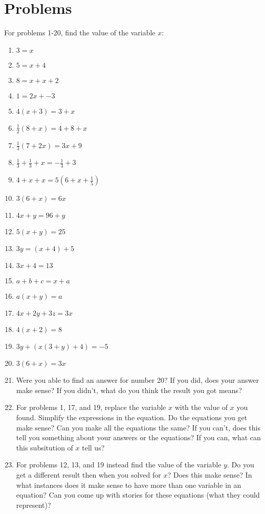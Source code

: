 \documentclass{article}
\begin{document}
\section*{Problems}
\begin{multicols*}{2}
    For problems 1-20, find the value of the variable $x$: 
    \begin{enumerate}
        \item $3 = x$ 
        \item $5 = x + 4 $
        \item $8 = x + x + 2$
        \item $1 = 2x + -3$
        \item $4(x + 3) = 3 + x$
        \item $\frac{1}{2} (8 + x) = 4 + 8 + x$ 
        \item $\frac{1}{3} ( 7 + 2x) = 3x + 9$
        \item $ \frac{1}{3} + \frac{1}{3} + x = -\frac{1}{3} + 3$
        \item $ 4 + x + x = 5(6 + x + \frac{1}{5}) $
        \item $ 3(6 + x) = 6x  $
        \item $ 4x + y = 96 + y $
        \item $ 5(x + y) = 25 $
        \item $ 3y = (x + 4) + 5$
        \item $ 3x + 4 = 13 $
        \item $ a + b + c = x + a$
        \item $ a(x + y) = a $
        \item $ 4x + 2y + 3z = 3x $
        \item $ 4(x + 2) = 8 $
        \item $ 3y + (x(3 + y) + 4) = -5 $
        \item $ 3(6 + x) = 3x $
        \item Were you able to find an answer for number 20? If you did, does your answer make sense? If you didn't, what do you think the result you got means? 
        \item For problems 1, 17, and 19, replace the variable $x$ with the value of $x$ you found. Simplify the expressions in the equation. Do the equations you get make sense? Can you make all the equations the same? If you can't, does this tell you something about your answers or the equations? If you can, what can this subsitution of $x$ tell us? 
        \item For problems 12, 13, and 19 instead find the value of the variable $y$. Do you get a different result then when you solved for $x$? Does this make sense? In what instances does it make sense to have more than one variable in an equation? Can you come up with stories for these equations (what they could represent)?

\end{enumerate}
\end{multicols*}
\end{document}

